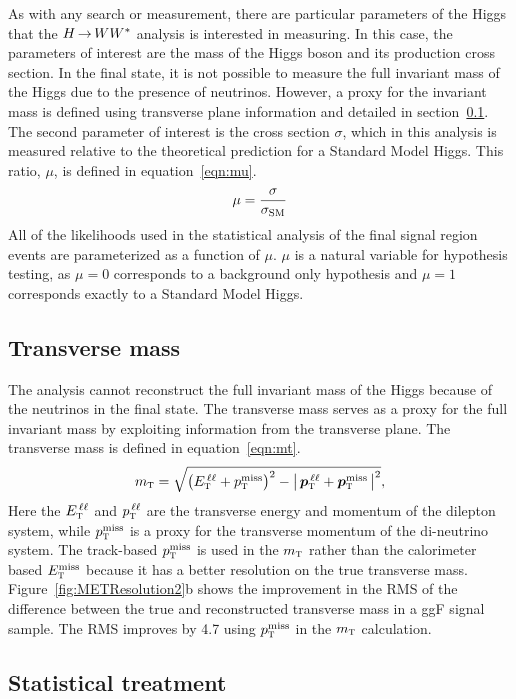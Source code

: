 As with any search or measurement, there are particular parameters of the Higgs that the $H{\,{\rightarrow}\,}WW^\ast$ analysis is interested in measuring. In this case, the parameters of interest are the mass of the Higgs boson and its production cross section. In the \HWWfull final state, it is not possible to measure the full invariant mass of the Higgs due to the presence of neutrinos. However, a proxy for the invariant mass is defined using transverse plane information and detailed in section~\ref{sec:mt}. The second parameter of interest is the cross section $\sigma$, which in this analysis is measured relative to the theoretical prediction for a Standard Model Higgs. This ratio, $\mu$, is defined in equation~\ref{eqn:mu}.
%
\begin{equation}
\mu = \frac{\sigma}{\sigma_{\rm SM}}
\label{eqn:mu}
\end{equation}
%
All of the likelihoods used in the statistical analysis of the final signal region events are parameterized as a function of $\mu$. $\mu$ is a natural variable for hypothesis testing, as $\mu = 0$ corresponds to a background only hypothesis and $\mu = 1$ corresponds exactly to a Standard Model Higgs. 

\subsection{Transverse mass}
\label{sec:mt}
The \HWWfull analysis cannot reconstruct the full invariant mass of the Higgs because of the neutrinos in the final state. The transverse mass serves as a proxy for the full invariant mass by exploiting information from the transverse plane. The transverse mass is defined in equation~\ref{eqn:mt}.
%
\begin{equation}
  m_{\textrm{\footnotesize\sc t}} = \sqrt{\left(E_{\textrm{\footnotesize\sc t}}^{\,\ell\ell} + p_{\textrm{\footnotesize\sc t}}^{\rm miss}\right)^2 - \left|\,\hbox{\bm{$p$}}_{\textrm{\footnotesize\sc t}}^{\,\ell\ell} + \hbox{\bm{$p$}}_{\textrm{\footnotesize\sc t}}^{\rm miss}\,\right|^2},
\label{eqn:mt}
\end{equation}
%
Here the $E_{\textrm{\footnotesize\sc t}}^{\,\ell\ell}$ and $p_{\textrm{\footnotesize\sc t}}^{\,\ell\ell}$ are the transverse energy and momentum of the dilepton system, while $p_{\textrm{\footnotesize\sc t}}^{\rm miss}$ is a proxy for the transverse momentum of the di-neutrino system. The track-based $p_{\textrm{\footnotesize\sc t}}^{\rm miss}$ is used in the $m_{\textrm{\footnotesize\sc t}}$ rather than the calorimeter based $E_{\textrm{\footnotesize\sc t}}^{\rm miss}$ because it has a better resolution on the true transverse mass. Figure~\ref{fig:METResolution2}b shows the improvement in the RMS of the difference between the true and reconstructed transverse mass in a ggF signal sample. The RMS improves by 4.7 \GeV using $p_{\textrm{\footnotesize\sc t}}^{\rm miss}$ in the $m_{\textrm{\footnotesize\sc t}}$ calculation.

\subsection{Statistical treatment}
\label{sec:ww_stats}


